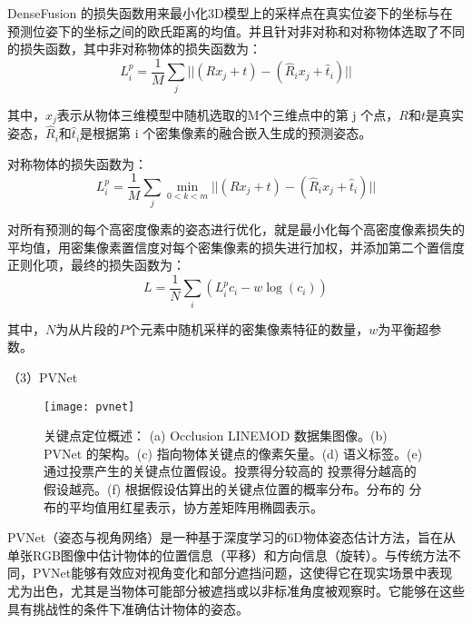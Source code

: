 DenseFusion 的损失函数用来最小化3D模型上的采样点在真实位姿下的坐标与在预测位姿下的坐标之间的欧氏距离的均值。并且针对非对称和对称物体选取了不同的损失函数，其中非对称物体的损失函数为：
\begin{equation}
	\label{equ:denseFusion_1}
	L^{p}_{i} = \frac{1}{M}\sum\limits_{j}||(Rx_{j} +t)-(\hat{R}_{i}x_{j} + \hat{t}_{i})||
\end{equation}

其中，$x_{j}$表示从物体三维模型中随机选取的M个三维点中的第 j 个点，$R$和$t$是真实姿态，$\hat{R}_{i}$和$\hat{t}_{i}$是根据第 i 个密集像素的融合嵌入生成的预测姿态。

对称物体的损失函数为：
\begin{equation}
	\label{equ:denseFusion_2}
	L^{p}_{i} = \frac{1}{M}\sum\limits_{j}\min\limits_{0<k<m}||(Rx_{j} +t)-(\hat{R}_{i}x_{j} + \hat{t}_{i})||
\end{equation}

对所有预测的每个高密度像素的姿态进行优化，就是最小化每个高密度像素损失的平均值，用密集像素置信度对每个密集像素的损失进行加权，并添加第二个置信度正则化项，最终的损失函数为：
\begin{equation}
	\label{equ:denseFusion_3}
	L= \frac{1}{N}\sum\limits_{i}(L_{i}^{p}c_{i} - w\log(c_{i}))
\end{equation}

其中，$N$为从片段的$P$个元素中随机采样的密集像素特征的数量，$w$为平衡超参数。

\noindent
（3）PVNet

  \begin{figure}[htb]
	\texttt{[image: pvnet]}
	\caption[关键点定位概述]{关键点定位概述： (a) Occlusion LINEMOD 数据集图像。(b) PVNet 的架构。(c)
		指向物体关键点的像素矢量。(d) 语义标签。(e) 通过投票产生的关键点位置假设。投票得分较高的
		投票得分越高的假设越亮。(f) 根据假设估算出的关键点位置的概率分布。分布的
		分布的平均值用红星表示，协方差矩阵用椭圆表示。} %
	\label{fig:pvnet}
\end{figure}
PVNet\cite{peng2019pvnet}（姿态与视角网络）是一种基于深度学习的6D物体姿态估计方法，旨在从单张RGB图像中估计物体的位置信息（平移）和方向信息（旋转）。与传统方法不同，PVNet能够有效应对视角变化和部分遮挡问题，这使得它在现实场景中表现尤为出色，尤其是当物体可能部分被遮挡或以非标准角度被观察时。它能够在这些具有挑战性的条件下准确估计物体的姿态。


